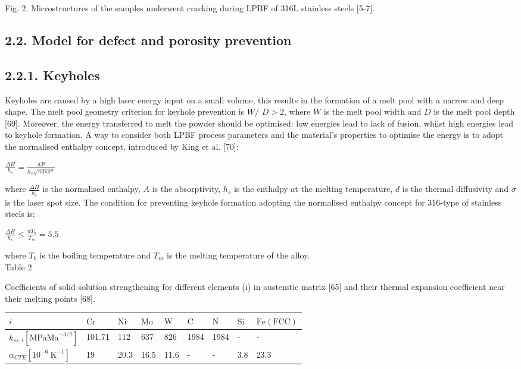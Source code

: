 \documentclass[10pt]{article}
\begin{document}
Fig. 2. Microstructures of the samples underwent cracking during LPBF of 316L stainless steels [5-7].

\subsection*{2.2. Model for defect and porosity prevention}
\subsection*{2.2.1. Keyholes}
Keyholes are caused by a high laser energy input on a small volume, this results in the formation of a melt pool with a narrow and deep shape. The melt pool geometry criterion for keyhole prevention is $W /$ $D>2$, where $W$ is the melt pool width and $D$ is the melt pool depth [69]. Moreover, the energy transferred to melt the powder should be optimised: low energies lead to lack of fusion, whilst high energies lead to keyhole formation. A way to consider both LPBF process parameters and the material's properties to optimise the energy is to adopt the normalised enthalpy concept, introduced by King et al. [70]:

$\frac{\Delta H}{h_{s}}=\frac{\mathrm{AP}}{h_{s} \sqrt{\pi \mathrm{dv} \sigma^{3}}}$

where $\frac{\Delta H}{h_{s}}$ is the normalised enthalpy, $A$ is the absorptivity, $h_{s}$ is the enthalpy at the melting temperature, $d$ is the thermal diffusivity and $\sigma$ is the laser spot size. The condition for preventing keyhole formation adopting the normalised enthalpy concept for 316-type of stainless steels is:

$\frac{\Delta H}{h_{s}} \leq \frac{\pi T_{b}}{T_{m}}=5.5$

where $T_{b}$ is the boiling temperature and $T_{m}$ is the melting temperature of the alloy.\\
Table 2

Coefficients of solid solution strengthening for different elements (i) in austenitic matrix [65] and their thermal expansion coefficient near their melting points [68].

\begin{center}
\begin{tabular}{lllllllll}
\hline
$i$ & $\mathrm{Cr}$ & $\mathrm{Ni}$ & $\mathrm{Mo}$ & $\mathrm{W}$ & $\mathrm{C}$ & $\mathrm{N}$ & $\mathrm{Si}$ & $\mathrm{Fe}(\mathrm{FCC})$ \\
\hline
$k_{s s, i}\left[\mathrm{MPa} \mathrm{Ma}^{-3 / 2}\right]$ & 101.71 & 112 & 637 & 826 & 1984 & 1984 & - & - \\
$\alpha_{C T E}\left[10^{-6} \mathrm{~K}^{-1}\right]$ & 19 & 20.3 & 16.5 & 11.6 & - & - & 3.8 & 23.3 \\
\end{tabular}
\end{center}
\end{document}
